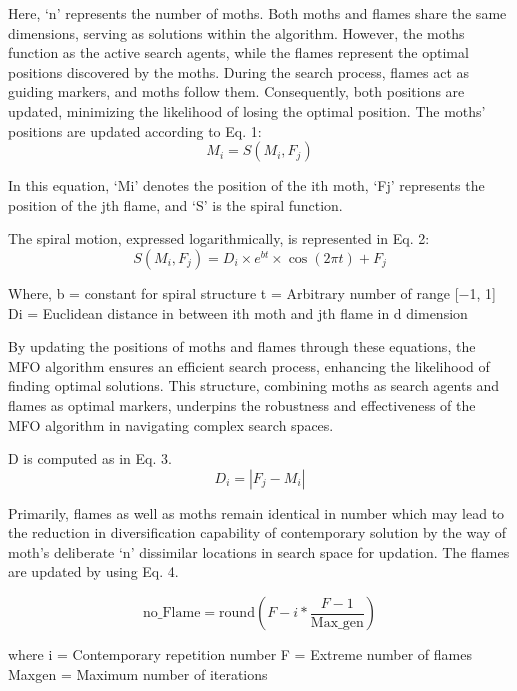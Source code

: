 \documentclass[conference]{IEEEtran}
\begin{document}
Here, ‘n’ represents the number of moths. Both moths and flames share the same dimensions, serving as solutions within the algorithm. However, the moths function as the active search agents, while the flames represent the optimal positions discovered by the moths. During the search process, flames act as guiding markers, and moths follow them. Consequently, both positions are updated, minimizing the likelihood of losing the optimal position. The moths' positions are updated according to Eq. 1:
\begin{equation}
    M_i=S\left(M_i, F_j\right)
    \end{equation}

In this equation, ‘Mi’ denotes the position of the ith moth, ‘Fj’ represents the position of the jth flame, and ‘S’ is the spiral function.

The spiral motion, expressed logarithmically, is represented in Eq. 2:
\begin{equation}
    S\left(M_i, F_j\right)=D_i \times e^{b t} \times \cos (2 \pi t)+F_j
    \end{equation}

Where,
b = constant for spiral structure
 t = Arbitrary number of range [−1, 1]
 Di = Euclidean distance in between ith moth and jth flame in d dimension

By updating the positions of moths and flames through these equations, the MFO algorithm ensures an efficient search process, enhancing the likelihood of finding optimal solutions. This structure, combining moths as search agents and flames as optimal markers, underpins the robustness and effectiveness of the MFO algorithm in navigating complex search spaces.

D is computed as in Eq. 3.	
\begin{equation}
    D_i=\left|F_j-M_i\right|
    \end{equation}

Primarily, flames as well as moths remain identical in number which may lead to the reduction in diversification capability of contemporary solution by the way of moth’s deliberate ‘n’ dissimilar locations in search space for updation. The flames are updated by using Eq. 4. 


\begin{equation}
\mathrm{no\_Flame} = \mathrm{round}\left(F - i \ast \frac{F - 1}{\mathrm{Max\_gen}}\right)
\end{equation}

where				
i = Contemporary repetition number
F = Extreme number of flames
Maxgen = Maximum number of iterations 
\end{document}
